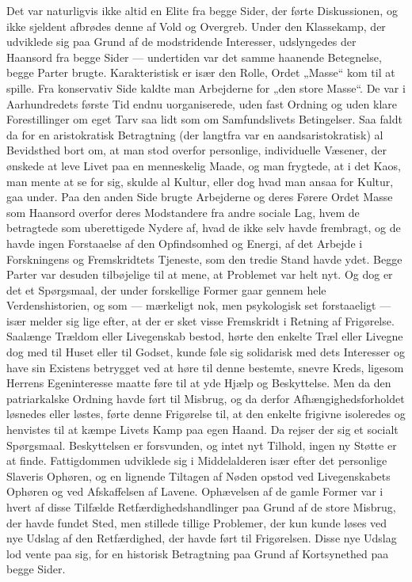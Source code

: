 \documentclass[12pt,a4paper,openany]{book}
\newcommand{\opage}[1]{\marginnote{\footnotesize\textit{[#1]}}}
\begin{document}
Det var naturligvis ikke altid en Elite fra begge Sider, der førte
Diskussionen, og ikke sjeldent afbrødes denne af Vold og Overgreb.
Under den Klassekamp, der udviklede sig paa Grund af de modstridende
Interesser, udslyngedes der Haansord fra begge Sider --- undertiden
var det samme haanende Betegnelse, begge Parter brugte. Karakteristisk
er især den Rolle, Ordet „Masse“ kom til at spille. Fra
konservativ Side kaldte man Arbejderne for „den store Masse“. De
var i Aarhundredets første Tid endnu uorganiserede, uden fast Ordning
og uden klare Forestillinger om eget Tarv saa lidt som om
Samfundslivets Betingelser. Saa faldt da for en aristokratisk Betragtning
(der langtfra var en aandsaristokratisk) al Bevidsthed bort
om, at man stod overfor personlige, individuelle Væsener, der ønskede
at leve Livet paa en menneskelig Maade, og man frygtede, at
i det Kaos, man mente at se for sig, skulde al Kultur, eller dog hvad
man ansaa for Kultur, gaa under. Paa den anden Side brugte Arbejderne
og deres Førere Ordet Masse som Haansord overfor deres
Modstandere fra andre sociale Lag, hvem de betragtede som uberettigede
Nydere af, hvad de ikke selv havde frembragt, og de havde
ingen Forstaaelse af den Opfindsomhed og Energi, af det Arbejde i
Forskningens og Fremskridtets Tjeneste, som den tredie Stand
havde ydet. Begge Parter var desuden tilbøjelige til at mene, at Problemet
var helt nyt. Og dog er det et Spørgsmaal, der under forskellige
Former gaar gennem hele Verdenshistorien, og som --- mærkeligt nok, men
psykologisk set forstaaeligt --- især melder sig lige
efter, at der er sket visse Fremskridt i Retning af Frigørelse. Saalænge
Trældom eller Livegenskab bestod, hørte den enkelte Træl
\opage{88}eller Livegne dog med til Huset eller til Godset, kunde føle sig solidarisk
med dets Interesser og have sin Existens betrygget ved at høre
til denne bestemte, snevre Kreds, ligesom Herrens Egeninteresse
maatte føre til at yde Hjælp og Beskyttelse. Men da den patriarkalske
Ordning havde ført til Misbrug, og da derfor Afhængighedsforholdet
løsnedes eller løstes, førte denne Frigørelse til, at den enkelte
frigivne isoleredes og henvistes til at kæmpe Livets Kamp paa egen
Haand. Da rejser der sig et socialt Spørgsmaal. Beskyttelsen er forsvunden,
og intet nyt Tilhold, ingen ny Støtte er at finde. Fattigdommen
udviklede sig i Middelalderen især efter det personlige Slaveris
Ophøren, og en lignende Tiltagen af Nøden opstod ved Livegenskabets
Ophøren og ved Afskaffelsen af Lavene. Ophævelsen
af de gamle Former var i hvert af disse Tilfælde Retfærdighedshandlinger
paa Grund af de store Misbrug, der havde fundet Sted, men
stillede tillige Problemer, der kun kunde løses ved nye Udslag af den
Retfærdighed, der havde ført til Frigørelsen. Disse nye Udslag lod
vente paa sig, for en historisk Betragtning paa Grund af Kortsynethed
paa begge Sider.
\end{document}
